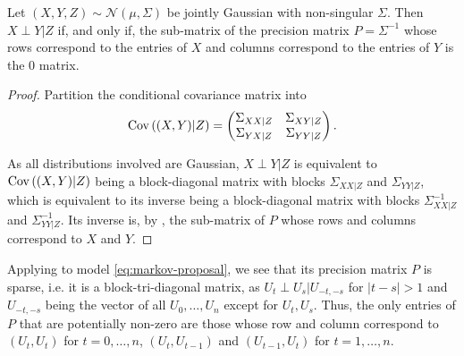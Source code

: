 \begin{lemma}
    \label{lem:gaussian_precision_zeros}
    Let $(X,Y,Z) \sim \mathcal N \left( \mu, \Sigma \right)$ be jointly Gaussian with non-singular $\Sigma$. Then $X \perp Y | Z$ if, and only if, the sub-matrix of the precision matrix $P = \Sigma^{-1}$ whose rows correspond to the entries of $X$ and columns correspond to the entries of $Y$ is the $0$ matrix.
\end{lemma}
\begin{proof}
    Partition the conditional covariance matrix into
    $$
    \operatorname{Cov} \left((X,Y) | Z\right) = \begin{pmatrix}
        \Sigma_{XX|Z} & \Sigma_{XY|Z} \\
        \Sigma_{YX|Z} & \Sigma_{YY|Z}
    \end{pmatrix}.
    $$

    As all distributions involved are Gaussian, $X \perp Y | Z$ is equivalent to $\operatorname{Cov} \left( (X,Y) |Z \right)$ being a block-diagonal matrix with blocks $\Sigma_{XX|Z}$ and $\Sigma_{YY|Z}$, which is equivalent to its inverse being a block-diagonal matrix with blocks $\Sigma_{XX|Z}^{-1}$ and $\Sigma_{YY|Z}^{-1}$. Its inverse is, by , the sub-matrix of $P$ whose rows and columns correspond to $X$ and $Y$. 
\end{proof}

Applying  to model \eqref{eq:markov-proposal}, we see that its precision matrix $P$ is sparse, i.e. it is a block-tri-diagonal matrix, as $U_{t} \perp U_{s} | U_{-t,-s}$ for $\lvert t - s\rvert > 1$ and $U_{-t,-s}$ being the vector of all $U_{0}, \dots, U_{n}$ except for $U_{t}, U_{s}$. Thus, the only entries of $P$ that are potentially non-zero are those whose row and column correspond to $(U_{t}, U_{t})$ for $t = 0, \dots, n$, $(U_{t}, U_{t - 1})$ and $(U_{t - 1}, U_{t})$ for $t=1, \dots, n$. 

